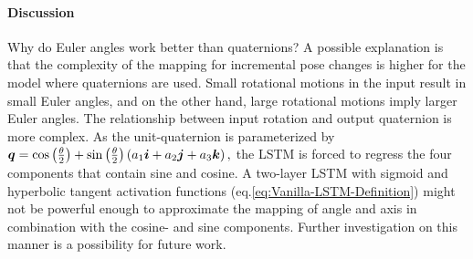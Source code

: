 		\paragraph{Discussion}
		Why do Euler angles work better than quaternions?
		A possible explanation is that the complexity of the mapping for incremental pose changes is higher for the model where quaternions are used.
		Small rotational motions in the input result in small Euler angles, and on the other hand, large rotational motions imply larger Euler angles.
		The relationship between input rotation and output quaternion is more complex.
		As the unit-quaternion is parameterized by 
		$
			\bm{q} = 
			\cos\left(\tfrac{\theta}{2}\right) + 
			\sin\left(\tfrac{\theta}{2}\right) \left(a_1 \bm{i} + a_2 \bm{j} + a_3 \bm{k}\right),
		$
		the LSTM is forced to regress the four components that contain sine and cosine.
		A two-layer LSTM with sigmoid and hyperbolic tangent activation functions (eq.\@ \ref{eq:Vanilla-LSTM-Definition}) might not be powerful enough to approximate the mapping of angle and axis in combination with the cosine- and sine components.
		Further investigation on this manner is a possibility for future work.
		

